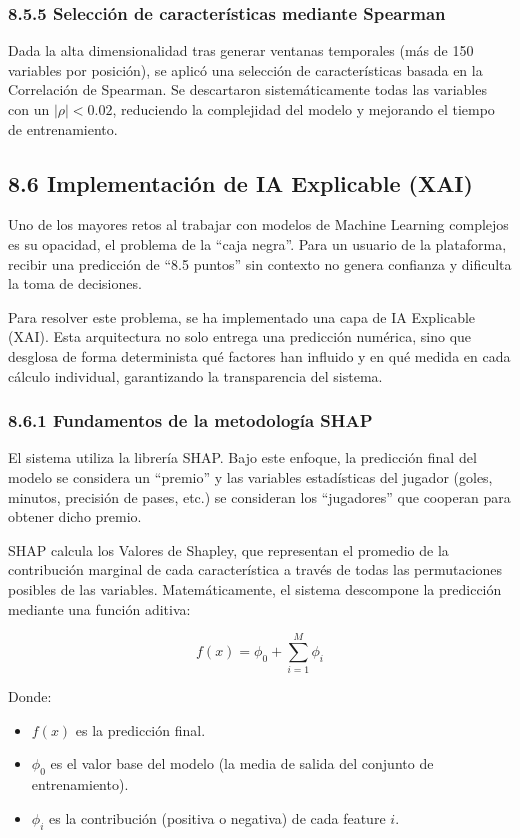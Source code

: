 \subsubsection{8.5.5 Selección de características mediante Spearman}

Dada la alta dimensionalidad tras generar ventanas temporales (más de 150 variables por posición), se aplicó una selección de características basada 
en la Correlación de Spearman. Se descartaron sistemáticamente todas las variables
  con un $|\rho| < 0.02$, reduciendo la complejidad del modelo y mejorando el tiempo de entrenamiento.

\subsection{8.6 Implementación de IA Explicable (XAI)}

Uno de los mayores retos al trabajar con modelos de Machine Learning complejos es su opacidad, el problema de la ``caja negra''. Para un usuario de la plataforma, recibir una predicción de ``8.5 puntos'' sin contexto
 no genera confianza y dificulta la toma de decisiones.

Para resolver este problema, se ha implementado una capa de IA Explicable (XAI). Esta arquitectura no solo entrega una predicción numérica, sino que 
desglosa de forma determinista qué factores han influido y en qué medida en cada cálculo individual, garantizando la transparencia del sistema.

\subsubsection{8.6.1 Fundamentos de la metodología SHAP}

El sistema utiliza la librería SHAP. Bajo este enfoque, la predicción final del modelo se
 considera un ``premio'' y las variables estadísticas del jugador (goles, minutos, precisión de pases, etc.) se consideran los ``jugadores'' que cooperan 
 para obtener dicho premio.

SHAP calcula los Valores de Shapley, que representan el promedio de la contribución marginal de cada característica a través de todas las permutaciones 
posibles de las variables. Matemáticamente, el sistema descompone la predicción mediante una función aditiva:

$$f(x) = \phi_0 + \sum_{i=1}^{M} \phi_i$$

Donde:

\begin{itemize}
\item $f(x)$ es la predicción final.
\item $\phi_0$ es el valor base del modelo (la media de salida del conjunto de entrenamiento).
\item $\phi_i$ es la contribución (positiva o negativa) de cada feature $i$.
\end{itemize}

